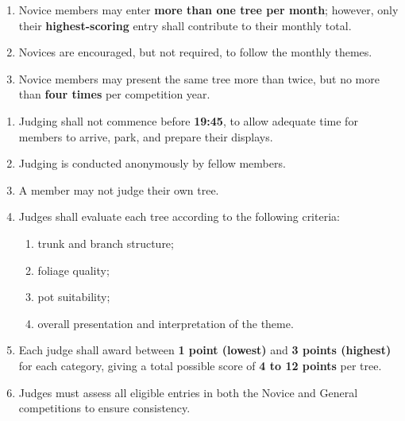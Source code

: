 \setcounter{TOTMsection}{3} %
\begin{enumerate}
    \item Novice members may enter \textbf{more than one tree per month}; however, only their \textbf{highest-scoring} entry shall contribute to their monthly total.
    \item Novices are encouraged, but not required, to follow the monthly themes.
    \item Novice members may present the same tree more than twice, but no more than \textbf{four times} per competition year.
\end{enumerate}

\setcounter{TOTMsection}{4} %
\begin{enumerate}
    \item Judging shall not commence before \textbf{19:45}, to allow adequate time for members to arrive, park, and prepare their displays.
    \item Judging is conducted anonymously by fellow members.
    \item A member may not judge their own tree.
    \item Judges shall evaluate each tree according to the following criteria:
        \begin{enumerate}
            \item trunk and branch structure;
            \item foliage quality;
            \item pot suitability;
            \item overall presentation and interpretation of the theme.
        \end{enumerate}
    \item Each judge shall award between \textbf{1 point (lowest)} and \textbf{3 points (highest)} for each category, giving a total possible score of \textbf{4 to 12 points} per tree.
    \item Judges must assess all eligible entries in both the Novice and General competitions to ensure consistency.
\end{enumerate}

